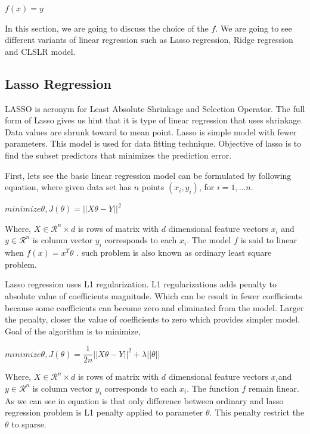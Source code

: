 \begin{center}
$f(x)=y$
\end{center}

In this section, we are going to discuss the choice of the $f$. We are going to see different variants of linear regression such as Lasso regression, Ridge regression and CLSLR model. 

\subsection{Lasso Regression}
LASSO is acronym for Least Absolute Shrinkage and Selection Operator. The full form of Lasso gives us hint that it is type of linear regression that uses shrinkage. Data values are shrunk toward to mean point. Lasso is simple model with fewer parameters. This model is used for data fitting technique. Objective of lasso is to find the subset predictors that minimizes the prediction error. 

First, lets see the basic linear regression model can be formulated by following equation, where given data set has $n$ points $(x_{i},y_{i})$, for $i = 1,...n$.

$ minimize \theta,   J(\theta) = || X \theta -Y ||^{2 }$ 

Where, $X \in \mathcal{R}^n \times d$ is rows of matrix with $d$ dimensional feature vectors $x_{i}$ and $y \in \mathcal{R}^n$ is column vector $y_{i}$ corresponds to each $x_{i}$. The model $f$ is said to linear when $f(x)=x^{T}\theta$ . such problem is also known as ordinary least square problem.


\par Lasso regression uses L1 regularization. L1 regularizations adds penalty to absolute value of coefficients magnitude. Which can be result in fewer coefficients because some coefficients can become zero and eliminated from the model.  Larger the penalty, closer the value of coefficients to zero which provides simpler model. Goal of the algorithm is to minimize, 

$minimize \theta,  J(\theta)=\dfrac{1}{2n} || X\theta - Y||^{2} + \lambda||\theta||$


Where, $X \in \mathcal{R}^n \times d$ is rows of matrix with $d$ dimensional feature vectors $x_{i}$and $y \in \mathcal{R}^n$ is column vector $y_{i}$ corresponds to each $x_{i}$. The function $f$ remain linear. As we can see in equation is that only difference between ordinary and lasso regression problem is L1 penalty applied to parameter $\theta$. This penalty restrict the $\theta$ to sparse. 

